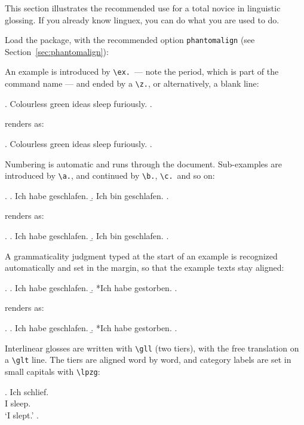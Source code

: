 \documentclass[11pt,a4paper]{article}
\newcommand{\cs}[1]{\texttt{\textbackslash #1}}
\newcommand{\pkg}[2][]{\textsf{#2}}
\newcommand{\rendered}{\par\medskip\noindent\textcolor{gray!70}{\small renders as:}\par\nobreak\smallskip}
\newcommand{\afterex}{\par\addvspace{\medskipamount}}
\begin{document}
This section illustrates the recommended use for a total novice in
linguistic glossing. If you already know \pkg{linguex}, you can do
what you are used to do.

Load the package, with the recommended option \texttt{phantomalign} (see Section~\ref{sec:phantomalign}):

\begin{code}
\usepackage[phantomalign]{linguexx}
\end{code}

\noindent An example is introduced by \cs{ex.}\ --- note the period, which
is part of the command name --- and ended by a \cs{z.}, or alternatively, a blank line:

\begin{code}
\ex. Colourless green ideas sleep furiously.
\z.
\end{code}

\rendered
\ex. Colourless green ideas sleep furiously.
\z.

\afterex
Numbering is automatic and runs through the document. Sub-examples are
introduced by \cs{a.}, and continued by \cs{b.}, \cs{c.}\ and so on:

\begin{code}
\ex.
\a. Ich habe geschlafen.
\b. Ich bin geschlafen.
\z.
\end{code}

\rendered
\ex.
\a. Ich habe geschlafen.
\b. Ich bin geschlafen.
\z.

\afterex
A grammaticality judgment typed at the start of an example is recognized
automatically and set in the margin, so that the example texts stay
aligned:

\begin{code}
\ex.
\a. Ich habe geschlafen.
\b. *Ich habe gestorben.
\z. 
\end{code}

\rendered
\ex.
\a. Ich habe geschlafen.
\b. *Ich habe gestorben.
\z.

\afterex
Interlinear glosses are written with \cs{gll} (two tiers), with the free
translation on a \cs{glt} line. The tiers are aligned word by word, and
category labels are set in small capitals with \cs{lpzg}:

\begin{code}
\ex. \gll Ich schlief. \\
          I   sleep. \\
\glt `I slept.'
\z.
\end{code}
\end{document}
